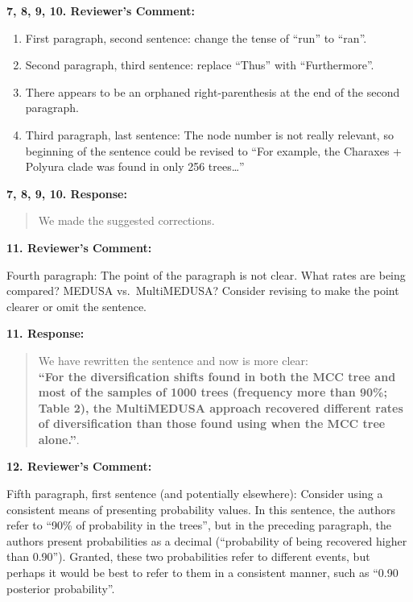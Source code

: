 \documentclass[]{article}
\begin{document}
\textbf{7, 8, 9, 10. Reviewer's Comment:}

\begin{enumerate}
\def\labelenumi{\arabic{enumi}.}
\setcounter{enumi}{6}
\itemsep1pt\parskip0pt
\item
  First paragraph, second sentence: change the tense of ``run'' to
  ``ran''.
\item
  Second paragraph, third sentence: replace ``Thus'' with
  ``Furthermore''.
\item
  There appears to be an orphaned right-parenthesis at the end of the
  second paragraph.
\item
  Third paragraph, last sentence: The node number is not really
  relevant, so beginning of the sentence could be revised to ``For
  example, the Charaxes + Polyura clade was found in only 256
  trees\ldots{}''
\end{enumerate}

\textbf{7, 8, 9, 10. Response:}

\begin{quote}
\color{blue}
We made the suggested corrections.
\end{quote}

\textbf{11. Reviewer's Comment:}

Fourth paragraph: The point of the paragraph is not clear. What rates
are being compared? MEDUSA vs.~MultiMEDUSA? Consider revising to make
the point clearer or omit the sentence.

\textbf{11. Response:}

\begin{quote}
\color{blue}
We have rewritten the sentence and now is more clear:\\\textbf{``For the
diversification shifts found in both the MCC tree and most of the
samples of 1000 trees (frequency more than 90\%; Table 2), the
MultiMEDUSA approach recovered different rates of diversification than
those found using when the MCC tree alone.''}.
\end{quote}

\textbf{12. Reviewer's Comment:}

Fifth paragraph, first sentence (and potentially elsewhere): Consider
using a consistent means of presenting probability values. In this
sentence, the authors refer to ``90\% of probability in the trees'', but
in the preceding paragraph, the authors present probabilities as a
decimal (``probability of being recovered higher than 0.90''). Granted,
these two probabilities refer to different events, but perhaps it would
be best to refer to them in a consistent manner, such as ``0.90
posterior probability''.
\end{document}
